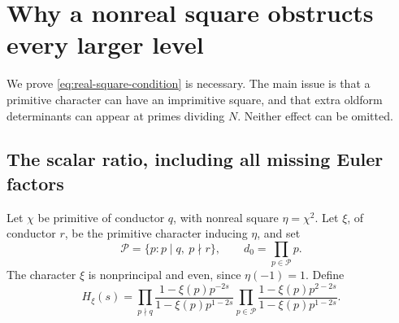 \section{Why a nonreal square obstructs every larger level}\label{sec:nonreal}

We prove \eqref{eq:real-square-condition} is necessary. The main issue
is that a primitive character can have an imprimitive square, and
that extra oldform determinants can appear at primes dividing \(N\).
Neither effect can be omitted.

\subsection{The scalar ratio, including all missing Euler factors}

Let \(\chi\) be primitive of conductor \(q\), with nonreal square
\(\eta=\chi^2\). Let \(\xi\), of conductor \(r\), be the primitive
character inducing \(\eta\), and set
\[
 \mathcal P=\{p:p\mid q,\ p\nmid r\},\qquad
 d_0=\prod_{p\in\mathcal P}p.
\]
The character \(\xi\) is nonprincipal and even, since \(\eta(-1)=1\).
Define
\begin{equation}\label{eq:H-xi}
 H_\xi(s)=
 \prod_{p\nmid q}\frac{1-\xi(p)p^{-2s}}{1-\xi(p)p^{1-2s}}
 \prod_{p\in\mathcal P}
       \frac{1-\xi(p)p^{2-2s}}{1-\xi(p)p^{1-2s}}.
\end{equation}

